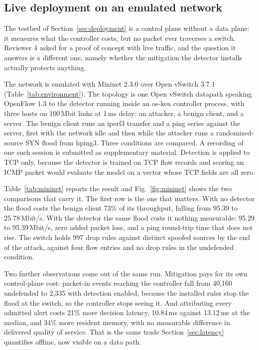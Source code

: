 \documentclass{ieeeaccess}
\begin{document}
\subsection{Live deployment on an emulated network}
\label{sec:mininet}
The testbed of Section~\ref{sec:deployment} is a control plane without a data
plane: it measures what the controller costs, but no packet ever traverses a
switch. Reviewer 4 asked for a proof of concept with live traffic, and the
question it answers is a different one, namely whether the mitigation the
detector installs actually protects anything.

The network is emulated with Mininet 2.3.0 over Open vSwitch 3.7.1
(Table~\ref{tab:environment}). The topology is one Open vSwitch datapath speaking
OpenFlow 1.3 to the detector running inside an os-ken controller process, with
three hosts on 100\,Mbit links at 1\,ms delay: an attacker, a benign client, and
a server. The benign client runs an iperf3 transfer and a ping series against the
server, first with the network idle and then while the attacker runs a
randomized-source SYN flood from hping3. Three conditions are compared. A
recording of one such session is submitted as supplementary material. Detection is applied to TCP only, because the detector
is trained on TCP flow records and scoring an ICMP packet would evaluate the model
on a vector whose TCP fields are all zero.

Table~\ref{tab:mininet} reports the result and Fig.~\ref{fig:mininet} shows the
two comparisons that carry it. The first row is the one that
matters. With no detector the flood costs the benign client 73\% of its
throughput, falling from 95.39 to 25.78\,Mbit/s. With the detector the same flood
costs it nothing measurable: 95.29 to 95.39\,Mbit/s, zero added packet loss, and
a ping round-trip time that does not rise. The switch holds 997 drop rules
against distinct spoofed sources by the end of the attack, against four flow
entries and no drop rules in the undefended condition.

Two further observations come out of the same run. Mitigation pays for its own
control-plane cost: packet-in events reaching the controller fall from 40,160
undefended to 2,335 with detection enabled, because the installed rules stop the
flood at the switch, so the controller stops seeing it. And attributing every
admitted alert costs 21\% more decision latency, 10.84\,ms against 13.12\,ms at
the median, and 34\% more resident memory, with no measurable difference in
delivered quality of service. That is the same trade
Section~\ref{sec:latency} quantifies offline, now visible on a data path.
\end{document}
